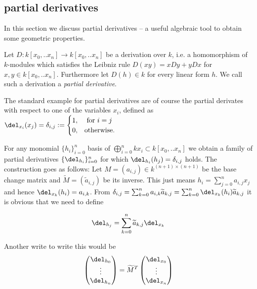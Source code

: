 \subsection{partial derivatives}

In this section we discuss partial derivatives -- a useful algebraic tool to obtain some geometric properties.

\begin{definition}
Let $D : k[x_0,..x_n] \to k[x_0,..x_n]$ be a derivation over $k$, i.e. a homomorphism of $k$-modules which satisfies the Leibniz rule $D(xy) = xDy+yDx$ for $x,y \in k[x_0,..x_n]$. Furthermore let $D(h) \in k$ for every linear form $h$. We call such a derivation a \emph{partial derivative}.
\end{definition}

\begin{example}
The standard example for partial derivatives are of course the partial derivates with respect to one of the variables $x_i$, defined as $\del_{x_i}(x_j) = \delta_{i,j} := \begin{cases} 1, & \text{ for } i = j \\ 0, & \text {otherwise.} \end{cases}$
\end{example}

\begin{example}
For any monomial $\{ h_i\}_{i=0}^n$ basis of $\bigoplus_{i=0}^n kx_i \subset k[x_0,..x_n]$ we obtain a family of partial derivatives $\{ \del_{h_i} \}_{i=0}^n$ for which $\del_{h_i}(h_j) = \delta_{i,j}$ holds. The construction goes as follows: Let $M = (a_{i,j})  \in k^{(n+1)\times(n+1)}$ be the base change matrix and $\widetilde M = (\widetilde a_{i,j})$ be its inverse.
This just means $h_i = \sum_{j=0}^n a_{i,j} x_j$ and hence $\del_{x_k}(h_i) = a_{i,k}$.
From $\delta_{i,j} = \sum_{k=0}^n a_{i,k}\widetilde a_{k,j}
= \sum_{k=0}^n \del_{x_k}(h_i) \widetilde a_{k,j}$ it is obvious that we need to define

\begin{equation}
\del_{h_j} = \sum_{k=0}^n \widetilde a_{k,j} \del_{x_k}
\end{equation}

Another write to write this would be
\begin{equation}
\begin{pmatrix} \del_{h_0} \\ \vdots \\ \del_{h_n} \end{pmatrix}
= \widetilde M^T
\begin{pmatrix} \del_{x_0} \\ \vdots \\ \del_{x_n} \end{pmatrix}
\end{equation}
\end{example}

